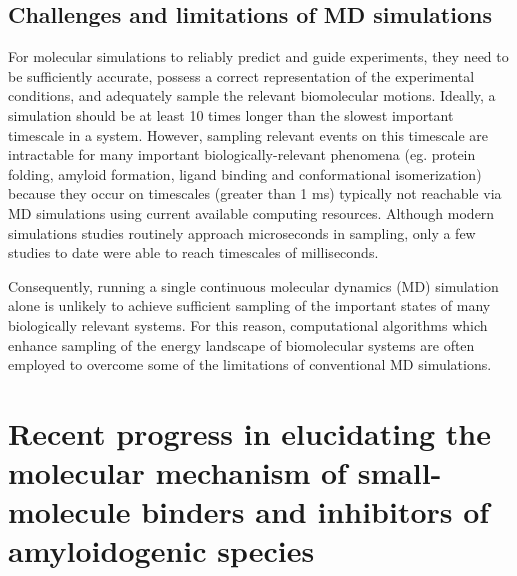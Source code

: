 \subsection{Challenges and limitations of MD simulations}

For molecular simulations to reliably predict and guide experiments, they need to be sufficiently accurate,  possess a correct representation of the experimental conditions, and adequately sample the relevant biomolecular motions.\cite{Mobley:2011ks} Ideally, a simulation should be at least 10 times longer than the slowest important timescale in a system.\cite{Zuckerman:2011dz} However, sampling relevant events on this timescale are intractable for many important biologically-relevant phenomena (eg. protein folding, amyloid formation, ligand binding and conformational isomerization) because they occur on timescales (greater than 1 ms) typically not reachable via MD simulations using current available computing resources.  Although modern simulations studies routinely approach microseconds in sampling, only a few studies to date were able to reach timescales of milliseconds.\cite{Dror:2012cs,Shan:2011bo,LindorffLarsen:2011gl}

Consequently, running a single continuous molecular dynamics (MD) simulation alone is unlikely to achieve sufficient sampling of the important states of many biologically relevant systems. For this reason, computational algorithms which enhance sampling of the energy landscape of biomolecular systems are often employed to overcome some of the limitations of conventional MD simulations.



\section{Recent progress in elucidating the molecular mechanism of small-molecule binders and inhibitors of amyloidogenic species}

